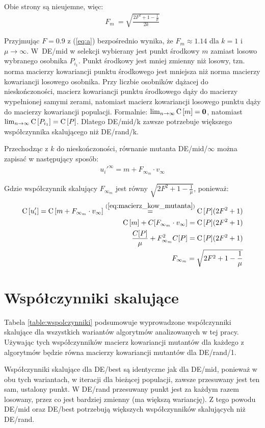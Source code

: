 \documentclass[a4paper,onecolumn,oneside,12pt,wide,floatssmall]{mwrep}
\def\C{{\rm C}\,}
\theoremstyle{definition}
\theoremstyle{plain}%
\theoremstyle{remark}
\begin{document}
Obie strony są nieujemne, więc:
\begin{align} \label{eq:a}
F_m\ = \sqrt{\frac{2F^2 + 1 - \frac{1}{\mu}}{2k}}
\end{align}

Przyjmując $F=0.9$ z (\ref{eq:a}) bezpośrednio wynika, że $F_m \approx 1.14$ dla $k=1$ i $\mu\to\infty$.
W~DE/mid w selekcji wybierany jest punkt środkowy $m$ zamiast losowo wybranego osobnika $P_{i_1}$.
Punkt środkowy jest mniej zmienny niż losowy, 
tzn. norma macierzy kowariancji punktu środkowego jest mniejsza niż norma macierzy kowariancji 
losowego osobnika. Przy liczbie osobników dążacej do nieskończoności, macierz kowariancji
punktu środkowego dąży do macierzy wypełnionej samymi zerami, natomiast macierz kowariancji
losowego punktu dąży do macierzy kowariancji populacji. Formalnie: 
$\lim_{n\to\infty} \C[m] = \textbf{0}$, natomiast $\lim_{n\to\infty} \C[P_{i_1}] = \C[P]$.
Dlatego DE/mid/k zawsze potrzebuje większego współczynnika skalującego niż DE/rand/k.

Przechodząc z $k$ do nieskończoności, równanie mutanta DE/mid/$\infty$ można zapisać
w następujący sposób:
\begin{align*}
u_i'^\infty = m + F_{\infty_m} \cdot v_\infty
\end{align*}

Gdzie współczynnik skalujący $F_{\infty_m}$ jest równy $\sqrt{2F^2 + 1 - \frac{1}{\mu}}$, ponieważ:
\begin{align*}
\C[u_i'] = \C[m + F_{\infty_m} \cdot v_\infty] \overset{(\ref{eq:macierz_kow_mutanta})}{=} \C[P](2F^2 + 1) \\
\C[m] + C[F_{\infty_m} \cdot v_\infty] = \C[P](2F^2 + 1) \\
\frac{C[P]}{\mu} + F_{\infty_m}^2 C[P] = \C[P](2F^2 + 1) \\
F_{\infty_m} = \sqrt{2F^2 + 1 - \frac{1}{\mu}}
\end{align*}

\section{Współczynniki skalujące}

Tabela \ref{table:wspolczynniki} podsumowuje wyprowadzone współczynniki skalujące dla wszystkich
wariantów algorytmów analizowanych w tej pracy. Używając tych współczynników macierz kowariancji
mutantów dla każdego z algorytmów będzie równa macierzy kowariancji mutantów dla DE/rand/1.

Współczynniki skalujące dla DE/best są identyczne jak dla DE/mid, ponieważ w obu tych wariantach,
w iteracji dla bieżącej populacji, zawsze przesuwany jest ten sam, ustalony punkt. W DE/rand
przesuwany punkt jest za każdym razem losowany, przez co jest bardziej zmienny (ma większą wariancję).
Z tego powodu DE/mid oraz DE/best potrzebują większych współczynników skalujących niż DE/rand.
\end{document}
